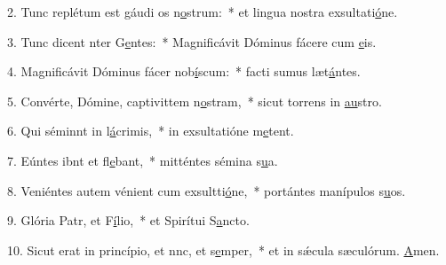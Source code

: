 2. Tunc replétum est gáudi os n\uline{o}strum:~* et lingua nostra exsultati\uline{ó}ne.\par 
3. Tunc dicent nter G\uline{e}ntes:~* Magnificávit Dóminus fácere cum \uline{e}is.\par 
4. Magnificávit Dóminus fácer nob\uline{í}scum:~* facti sumus læt\uline{á}ntes.\par 
5. Convérte, Dómine, captivittem n\uline{o}stram,~* sicut torrens in \uline{au}stro.\par 
6. Qui séminnt in l\uline{á}crimis,~* in exsultatióne m\uline{e}tent.\par 
7. Eúntes ibnt et fl\uline{e}bant,~* mitténtes sémina s\uline{u}a.\par 
8. Veniéntes autem vénient cum exsultti\uline{ó}ne,~* portántes manípulos s\uline{u}os.\par 
9. Glória Patr, et F\uline{í}lio,~* et Spirítui S\uline{a}ncto.\par 
10. Sicut erat in princípio, et nnc, et s\uline{e}mper,~* et in sǽcula sæculórum. \uline{A}men.\par 
